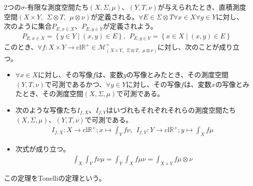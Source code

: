 \documentclass[dvipdfmx]{jsarticle}
\begin{document}
\begin{thm}[Tonelliの定理]\label{4.6.4.3}
2つの$\sigma$-有限な測度空間たち$(X,\varSigma,\mu)$、$(Y,T,\nu)$が与えられたとき、直積測度空間$(X \times Y,\ \ \varSigma \otimes T,\ \ \mu \otimes \nu)$が定義される。$\forall E \in \varSigma \otimes T\forall x \in X\forall y \in Y$に対し、次のように集合$P_{E,x \in X}$、$P_{E,y \in Y}$が定義されよう。
\begin{align*}
P_{E,x \in X} = \left\{ y \in Y \middle| (x,y) \in E \right\},\ \ P_{E,y \in Y} = \left\{ x \in X \middle| (x,y) \in E \right\}
\end{align*}
このとき、$\forall f:X \times Y \rightarrow \mathrm{cl}\mathbb{R}^{+} \in \mathcal{M}_{(X \times Y,\ \ \varSigma \otimes T,\ \ \mu \otimes \nu)}^{+}$に対し、次のことが成り立つ。
\begin{itemize}
\item
  $\forall x \in X$に対し、その写像$f$は、変数$y$の写像とみたとき、その測度空間$(Y,T,\nu)$で可測であるかつ、$\forall y \in Y$に対し、その写像$f$は、変数$x$の写像とみたとき、その測度空間$(X,\varSigma,\mu)$で可測である。
\item
  次のような写像たち$I_{f,X}$、$I_{f,Y}$はいづれもそれぞれそれらの測度空間たち$(X,\varSigma,\mu)$、$(Y,T,\nu)$で可測である。
\begin{align*}
I_{f,X}:X \rightarrow \mathrm{cl}\mathbb{R}^{+};x \mapsto \int_{Y} {f\nu},\ \ I_{f,Y}:Y \rightarrow \mathrm{cl}\mathbb{R}^{+};y \mapsto \int_{X} {f\mu}
\end{align*}
\item
  次式が成り立つ。
\begin{align*}
\int_{X} {\int_{Y} {f\nu}\mu} = \int_{Y} {\int_{X} {f\mu}\nu} = \int_{X \times Y} {f\mu \otimes \nu}
\end{align*}
\end{itemize}
この定理をTonelliの定理という。
\end{thm}
\end{document}
